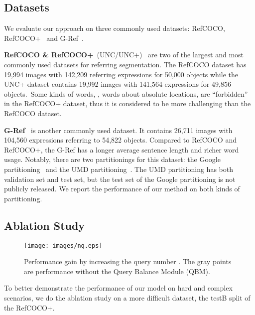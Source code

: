 \documentclass[10pt,twocolumn,letterpaper]{article}
\begin{document}
\subsection{Datasets}

We evaluate our approach on three commonly used datasets: RefCOCO, RefCOCO+~\cite{yu2016modeling} and G-Ref~\cite{mao2016generation, nagaraja2016modeling}.

\textbf{RefCOCO \& RefCOCO+}~(UNC/UNC+)~\cite{yu2016modeling} are two of the largest and most commonly used datasets for referring segmentation. The RefCOCO dataset has 19,994 images with 142,209 referring expressions for 50,000 objects while the UNC+ dataset contains 19,992 images with 141,564 expressions for 49,856 objects.~Some kinds of words, \eg, words about absolute locations, are ``forbidden'' in the RefCOCO+ dataset, thus it is considered to be more challenging than the RefCOCO dataset.

\textbf{G-Ref}~\cite{mao2016generation, nagaraja2016modeling} is another commonly used dataset. It contains 26,711 images with 104,560 expressions referring to 54,822 objects. Compared to RefCOCO and RefCOCO+, the G-Ref has a longer average sentence length and richer word usage. Notably, there are two partitionings for this dataset: the Google partitioning~\cite{mao2016generation} and the UMD partitioning~\cite{nagaraja2016modeling}. The UMD partitioning has both validation set and test set, but the test set of the Google partitioning is not publicly released. We report the performance of our method on both kinds of partitioning.



\subsection{Ablation Study}

\begin{figure}[t!]
   \begin{center}
      \texttt{[image: images/nq.eps]}
   \end{center}
   \vspace{-0.2in}
   \caption{Performance gain by increasing the query number . The gray points are performance without the Query Balance Module (QBM).}
   \vspace{-0.11in}
   \label{fig:nq}
\end{figure}


To better demonstrate the performance of our model on hard and complex scenarios, we do the ablation study on a more difficult dataset, the testB split of the RefCOCO+.
\end{document}
